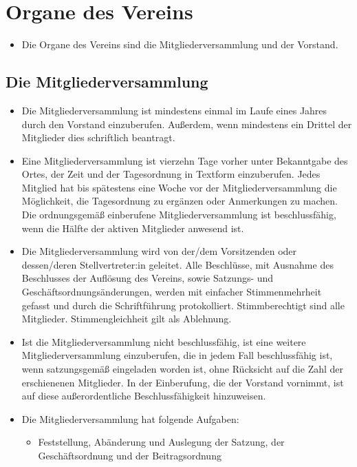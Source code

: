 \documentclass[12pt,paper=a4,ngerman]{report}
\begin{document}
\section{Organe des Vereins}

\begin{itemize}
    \item Die Organe des Vereins sind die Mitgliederversammlung und der Vorstand.
\end{itemize}

\subsection{Die Mitgliederversammlung}

\begin{itemize}
    \item Die Mitgliederversammlung ist mindestens einmal im Laufe eines Jahres durch den Vorstand einzuberufen. Außerdem, wenn mindestens ein Drittel der Mitglieder dies schriftlich beantragt.
    \item Eine Mitgliederversammlung ist vierzehn Tage vorher unter Bekanntgabe des Ortes, der Zeit und der Tagesordnung in Textform einzuberufen. Jedes Mitglied hat bis spätestens eine Woche vor der Mitgliederversammlung die Möglichkeit, die Tagesordnung zu ergänzen oder Anmerkungen zu machen. Die ordnungsgemäß einberufene Mitgliederversammlung ist beschlussfähig, wenn die Hälfte der aktiven Mitglieder anwesend ist.
    \item Die Mitgliederversammlung wird von der/dem Vorsitzenden oder dessen/deren Stellvertreter:in geleitet. Alle Beschlüsse, mit Ausnahme des Beschlusses der Auflösung des Vereins, sowie Satzungs- und Geschäftsordnungsänderungen, werden mit einfacher Stimmenmehrheit gefasst und durch die Schriftführung protokolliert. Stimmberechtigt sind alle Mitglieder. Stimmengleichheit gilt als Ablehnung.
    \item Ist die Mitgliederversammlung nicht beschlussfähig, ist eine weitere Mitgliederversammlung einzuberufen, die in jedem Fall beschlussfähig ist, wenn satzungsgemäß eingeladen worden ist, ohne Rücksicht auf die Zahl der erschienenen Mitglieder. In der Einberufung, die der Vorstand vornimmt, ist auf diese außerordentliche Beschlussfähigkeit hinzuweisen.
    \item Die Mitgliederversammlung hat folgende Aufgaben:
    \begin{itemize}
        \item Feststellung, Abänderung und Auslegung der Satzung, der Geschäftsordnung und der Beitragsordnung

\end{itemize}
\end{itemize}
\end{document}
